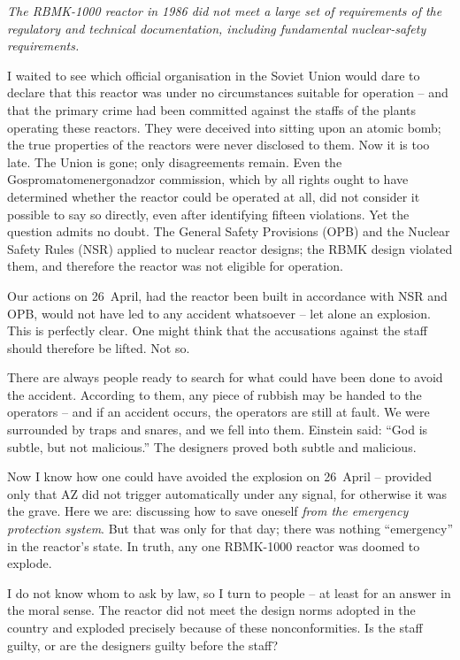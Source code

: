 \documentclass[openright]{bookest}
\begin{document}
\emph{The RBMK-1000 reactor in 1986 did not meet a large set of requirements of the regulatory and technical documentation, including fundamental nuclear-safety requirements.}

I waited to see which official organisation in the Soviet Union would dare to declare that this reactor was under no circumstances suitable for operation -- and that the primary crime had been committed against the staffs of the plants operating these reactors. They were deceived into sitting upon an atomic bomb; the true properties of the reactors were never disclosed to them. Now it is too late. The Union is gone; only disagreements remain. Even the Gospromatomenergonadzor commission, which by all rights ought to have determined whether the reactor could be operated at all, did not consider it possible to say so directly, even after identifying fifteen violations. Yet the question admits no doubt. The General Safety Provisions (OPB) and the Nuclear Safety Rules (NSR) applied to nuclear reactor designs; the RBMK design violated them, and therefore the reactor was not eligible for operation.

Our actions on 26~April, had the reactor been built in accordance with NSR and OPB, would not have led to any accident whatsoever -- let alone an explosion. This is perfectly clear. One might think that the accusations against the staff should therefore be lifted. Not so.

There are always people ready to search for what could have been done to avoid the accident. According to them, any piece of rubbish may be handed to the operators -- and if an accident occurs, the operators are still at fault. We were surrounded by traps and snares, and we fell into them. Einstein said: ``God is subtle, but not malicious.'' The designers proved both subtle and malicious.

Now I know how one could have avoided the explosion on 26~April -- provided only that AZ did not trigger automatically under any signal, for otherwise it was the grave. Here we are: discussing how to save oneself \textit{from the emergency protection system}. But that was only for that day; there was nothing ``emergency'' in the reactor's state. In truth, any one RBMK-1000 reactor was doomed to explode.

I do not know whom to ask by law, so I turn to people -- at least for an answer in the moral sense. The reactor did not meet the design norms adopted in the country and exploded precisely because of these nonconformities. Is the staff guilty, or are the designers guilty before the staff?
\end{document}
